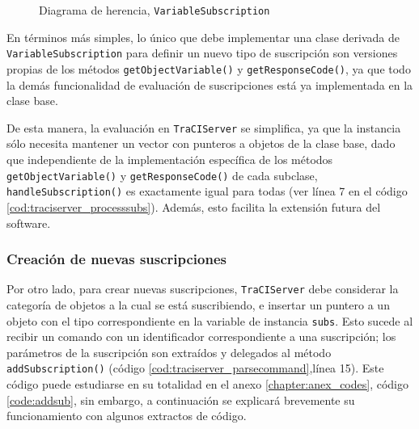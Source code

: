 \begin{figure}[]
    \centering
    
    \caption{Diagrama de herencia, \texttt{VariableSubscription}}
    \label{fig:cd_variablesub}
\end{figure}

En términos más simples, lo único que debe implementar una clase derivada de \texttt{VariableSubscription} para definir un nuevo tipo de suscripción son versiones propias de los métodos \texttt{getObjectVariable()} y \texttt{getResponseCode()}, ya que todo la demás funcionalidad de evaluación de suscripciones está ya implementada en la clase base. 

De esta manera, la evaluación en \texttt{TraCIServer} se simplifica, ya que la instancia sólo necesita mantener un vector con punteros a objetos de la clase base, dado que independiente de la implementación específica de los métodos \texttt{getObjectVariable()} y \texttt{getResponseCode()} de cada subclase, \texttt{handleSubscription()} es exactamente igual para todas (ver línea 7 en el código \ref{cod:traciserver_processsubs}). Además, esto facilita la extensión futura del software.

\begin{figure*}[h]

\end{figure*}

\subsubsection{Creación de nuevas suscripciones}

Por otro lado, para crear nuevas suscripciones, \texttt{TraCIServer} debe considerar la categoría de objetos a la cual se está suscribiendo, e insertar un puntero a un objeto con el tipo correspondiente en la variable de instancia \texttt{subs}. Esto sucede al recibir un comando con un identificador correspondiente a una suscripción; los parámetros de la suscripción son extraídos y delegados al método \texttt{addSubscription()} (código \ref{cod:traciserver_parsecommand},línea 15). Este código puede estudiarse en su totalidad en el anexo \ref{chapter:anex_codes}, código \ref{code:addsub}, sin embargo, a continuación se explicará brevemente su funcionamiento con algunos extractos de código.


